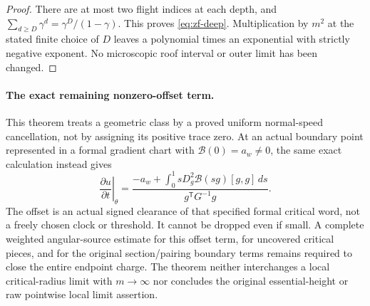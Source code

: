 \begin{proof}
There are at most two flight indices at each depth, and
$\sum_{d\ge D}\gamma^d=\gamma^D/(1-\gamma)$.
This proves \eqref{eq:zf-deep}.  Multiplication by $m^2$ at the
stated finite choice of $D$ leaves a polynomial times an exponential
with strictly negative exponent.  No microscopic roof interval or
outer limit has been changed.
\end{proof}

\paragraph{The exact remaining nonzero-offset term.}
This theorem treats a geometric class by a proved uniform normal-speed
cancellation, not by assigning its positive trace zero.  At an actual
boundary point represented in a formal gradient chart with
$\mathcal B(0)=a_w\ne0$, the same exact calculation instead gives
\[
 \left.\frac{\partial u}{\partial t}\right|_\theta
 =\frac{-a_w+\int_0^1sD_g^2\mathcal B(sg)[g,g]\,ds}
        {g^{\mathsf T}G^{-1}g}.
\]
The offset is an actual signed clearance of that specified formal
critical word, not a freely chosen clock or threshold.  It cannot be
dropped even if small.  A complete weighted angular-source estimate
for this offset term, for uncovered critical pieces, and for the
original section/pairing boundary terms remains required to close
the entire endpoint charge.  The theorem neither interchanges a
local critical-radius limit with $m\to\infty$ nor concludes the
original essential-height or raw pointwise local limit assertion.
